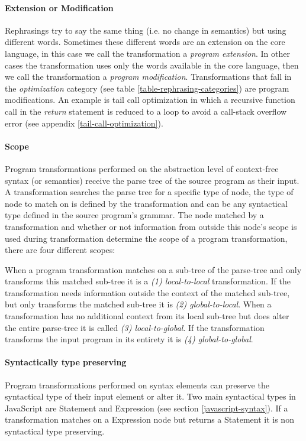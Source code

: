 \paragraph{Extension or Modification}
Rephrasings try to say the same thing (i.e. no change in semantics) but using different words\cite{Visser2001}. Sometimes these different words are an extension on the core language, in this case we call the transformation a \textit{program extension}. In other cases the transformation uses only the words available in the core language, then we call the transformation a \textit{program modification}. Transformations that fall in the \textit{optimization} category (see table \ref{table-rephrasing-categories}) are program modifications. An example is tail call optimization in which a recursive function call in the \textit{return} statement is reduced to a loop to avoid a call-stack overflow error (see appendix \ref{tail-call-optimization}).

\paragraph{Scope}
Program transformations performed on the abstraction level of context-free syntax (or semantics) receive the parse tree of the source program as their input. A transformation searches the parse tree for a specific type of node, the type of node to match on is defined by the transformation and can be any syntactical type defined in the source program's grammar. The node matched by a transformation and whether or not information from outside this node's scope is used during transformation determine the scope of a program transformation, there are four different scopes:

When a program transformation matches on a sub-tree of the parse-tree and only transforms this matched sub-tree it is a \textit{(1) local-to-local} transformation. If the transformation needs information outside the context of the matched sub-tree, but only transforms the matched sub-tree it is \textit{(2) global-to-local}. When a transformation has no additional context from its local sub-tree but does alter the entire parse-tree it is called \textit{(3) local-to-global}. If the transformation transforms the input program in its entirety it is \textit{(4) global-to-global}.

\paragraph{Syntactically type preserving}
Program transformations performed on syntax elements can preserve the syntactical type of their input element or alter it. Two main syntactical types in JavaScript are Statement and Expression (see section \ref{javascript-syntax}). If a transformation matches on a Expression node but returns a Statement it is non syntactical type preserving.

